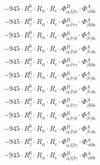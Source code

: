 \documentclass{article}
\begin{document}
\begin{subequations}
\begin{gather}
\begin{array}{c}
 \\[0.2em] 		 - 945 \cdot R_{z}^{6} \cdot R_{\alpha{}} \cdot R_{\epsilon{}} \cdot \Phi{}^{B}_{\alpha{}\beta{}\beta{}\gamma{}} \cdot \Phi{}^{A}_{\gamma{}\delta{}\delta{}\epsilon{}} 
 \\[0.2em] 		 - 945 \cdot R_{z}^{6} \cdot R_{\alpha{}} \cdot R_{\epsilon{}} \cdot \Phi{}^{B}_{\alpha{}\beta{}\gamma{}\gamma{}} \cdot \Phi{}^{A}_{\beta{}\delta{}\delta{}\epsilon{}} 
 \\[0.2em] 		 - 945 \cdot R_{z}^{6} \cdot R_{\alpha{}} \cdot R_{\epsilon{}} \cdot \Phi{}^{B}_{\alpha{}\beta{}\gamma{}\delta{}} \cdot \Phi{}^{A}_{\beta{}\gamma{}\delta{}\epsilon{}} 
 \\[0.2em] 		 - 945 \cdot R_{z}^{6} \cdot R_{\alpha{}} \cdot R_{\epsilon{}} \cdot \Phi{}^{B}_{\alpha{}\beta{}\gamma{}\delta{}} \cdot \Phi{}^{A}_{\beta{}\gamma{}\delta{}\epsilon{}} 
 \\[0.2em] 		 - 945 \cdot R_{z}^{6} \cdot R_{\alpha{}} \cdot R_{\epsilon{}} \cdot \Phi{}^{B}_{\alpha{}\beta{}\gamma{}\gamma{}} \cdot \Phi{}^{A}_{\beta{}\delta{}\delta{}\epsilon{}} 
 \\[0.2em] 		 - 945 \cdot R_{z}^{6} \cdot R_{\alpha{}} \cdot R_{\epsilon{}} \cdot \Phi{}^{B}_{\alpha{}\beta{}\gamma{}\delta{}} \cdot \Phi{}^{A}_{\beta{}\gamma{}\delta{}\epsilon{}} 
 \\[0.2em] 		 - 945 \cdot R_{z}^{6} \cdot R_{\alpha{}} \cdot R_{\epsilon{}} \cdot \Phi{}^{B}_{\alpha{}\beta{}\gamma{}\delta{}} \cdot \Phi{}^{A}_{\beta{}\gamma{}\delta{}\epsilon{}} 
 \\[0.2em] 		 - 945 \cdot R_{z}^{6} \cdot R_{\alpha{}} \cdot R_{\epsilon{}} \cdot \Phi{}^{B}_{\alpha{}\beta{}\gamma{}\gamma{}} \cdot \Phi{}^{A}_{\beta{}\delta{}\delta{}\epsilon{}} 
 \\[0.2em] 		 - 945 \cdot R_{z}^{6} \cdot R_{\alpha{}} \cdot R_{\epsilon{}} \cdot \Phi{}^{B}_{\alpha{}\beta{}\gamma{}\delta{}} \cdot \Phi{}^{A}_{\beta{}\gamma{}\delta{}\epsilon{}} 
 \\[0.2em] 		 - 945 \cdot R_{z}^{6} \cdot R_{\alpha{}} \cdot R_{\epsilon{}} \cdot \Phi{}^{B}_{\alpha{}\beta{}\gamma{}\delta{}} \cdot \Phi{}^{A}_{\beta{}\gamma{}\delta{}\epsilon{}} 
 \\[0.2em] 		 - 945 \cdot R_{z}^{6} \cdot R_{\alpha{}} \cdot R_{\epsilon{}} \cdot \Phi{}^{B}_{\alpha{}\beta{}\beta{}\gamma{}} \cdot \Phi{}^{A}_{\gamma{}\delta{}\delta{}\epsilon{}} 
 \\[0.2em] 		 - 945 \cdot R_{z}^{6} \cdot R_{\alpha{}} \cdot R_{\epsilon{}} \cdot \Phi{}^{B}_{\alpha{}\beta{}\beta{}\gamma{}} \cdot \Phi{}^{A}_{\gamma{}\delta{}\delta{}\epsilon{}} 

\end{array}
\end{gather}
\end{subequations}
\end{document}
